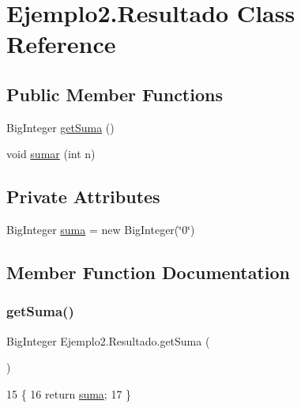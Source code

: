 \hypertarget{class_ejemplo2_1_1_resultado}{}\section{Ejemplo2.\+Resultado Class Reference}
\label{class_ejemplo2_1_1_resultado}
\subsection*{Public Member Functions}
\begin{DoxyCompactItemize}
\item 
Big\+Integer \mbox{\hyperlink{class_ejemplo2_1_1_resultado_a47a67a499b8df300f07e29d7cda23b7e}{get\+Suma}} ()
\item 
void \mbox{\hyperlink{class_ejemplo2_1_1_resultado_a5380048af041ad186602af99251f40b8}{sumar}} (int n)
\end{DoxyCompactItemize}
\subsection*{Private Attributes}
\begin{DoxyCompactItemize}
\item 
Big\+Integer \mbox{\hyperlink{class_ejemplo2_1_1_resultado_a9b798ec8c3c4e919b47cb0c95ee6ebc9}{suma}} = new Big\+Integer(\char`\"{}0\char`\"{})
\end{DoxyCompactItemize}


\subsection{Member Function Documentation}
\mbox{\label{class_ejemplo2_1_1_resultado_a47a67a499b8df300f07e29d7cda23b7e}} 
\subsubsection{\texorpdfstring{get\+Suma()}{getSuma()}}
{\footnotesize\ttfamily Big\+Integer Ejemplo2.\+Resultado.\+get\+Suma (\begin{DoxyParamCaption}{ }\end{DoxyParamCaption})\hspace{0.3cm}{\ttfamily [inline]}}


\begin{DoxyCode}
15     \{
16         \textcolor{keywordflow}{return} \mbox{\hyperlink{class_ejemplo2_1_1_resultado_a9b798ec8c3c4e919b47cb0c95ee6ebc9}{suma}};
17     \}
\end{DoxyCode}
\mbox{\label{class_ejemplo2_1_1_resultado_a5380048af041ad186602af99251f40b8}} 
